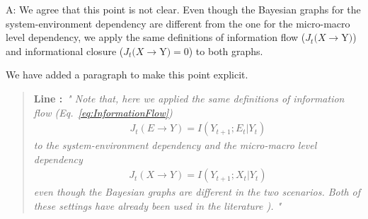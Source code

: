 \documentclass[utf8]{article}
\newenvironment{ans}  
    {\color{Black}\noindent A:}
    {~\newline}
\newcommand{\addnew}[2]{\blockcquote{}{\textbf{Line #1:}~\newline\textit{"#2"}}
}
\begin{document}
    	\begin{ans}
    		We agree that this point is not clear. Even though the Bayesian graphs for the system-environment dependency are different from the one for the micro-macro level dependency, we apply the same definitions of information flow ($J_{t}(X \rightarrow $Y$ )$) and informational closure ($J_{t}(X \rightarrow $Y$ )=0$) to both graphs. 
    		
    		
    		
    		We have added a paragraph to make this point explicit. 
    		
    		\addnew{}{
    			Note that, here we applied the same definitions of information flow (Eq.~\ref{eq:InformationFlow}) 
    			\begin{align}
    			    J_{t}(E \rightarrow Y )=I(Y_{t+1};E_t|Y_t)
    			\end{align}
    			to the system-environment dependency and the micro-macro level dependency
                 \begin{align}
    			    J_{t}(X \rightarrow Y )=I(Y_{t+1};X_t|Y_t)
    			\end{align}  
                 even though the Bayesian graphs are different in the two scenarios. Both of these settings have already been used in the literature \citep[see][]{BERTSCHINGER.2006, PFANTE.2014}).
    		}	
    	\end{ans}
    
\end{document}
